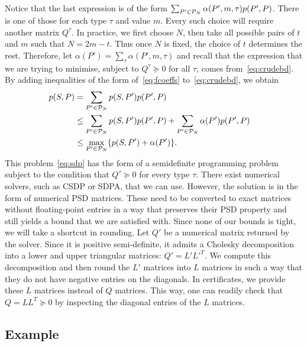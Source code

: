 Notice that the last expression is of the form $\sum_{P' \in \P_N} \alpha(P',m,\tau)p(P',P)$. There is one of those for each type $\tau$ and value $m$. Every such choice will require another matrix $Q^\tau$. In practice, we first choose $N$, then take all possible pairs of $t$ and $m$ such that $N = 2m-t$. Thus once $N$ is fixed, the choice of $t$ determines the rest. Therefore, let $\alpha(P') = \sum_{\tau} \alpha(P',m,\tau)$ and recall that the expression that we are trying to minimise, subject to $Q^\tau \succeq 0$ for all $\tau$, comes from~\eqref{eq:crudebd}. By adding inequalities of the form of~\eqref{eq:fcoeffs} to~\eqref{eq:crudebd}, we obtain 
\begin{align}
p(S,P) &= \sum_{P'\in \P_N}p(S,P')p(P',P) \notag\\
  &\leq \sum_{P'\in \P_N}p(S,P')p(P',P) + \sum_{P'\in \P_N}\alpha(P')p(P',P)\quad \notag\\
  &\leq \max_{P'\in \P_N}\{p(S,P') + \alpha(P')\}. \label{eq:sdp}
\end{align}
This problem~\eqref{eq:sdp} has the form of a semidefinite programming problem subject to the condition that $Q^\tau \succeq 0$ for every type $\tau$. There exist numerical solvers, such as CSDP or SDPA, that we can use. However, the solution is in the form of numerical PSD matrices. These need to be converted to exact matrices without floating-point entries in a way that preserves their PSD property and still yields a bound that we are satisfied with. Since none of our bounds is tight, we will take a shortcut in rounding. Let $Q'$ be a numerical matrix returned by the solver. Since it is positive semi-definite, it admits a Cholesky decomposition into a lower and upper triangular matrices: $Q' = L'L'^T$. We compute this decomposition and then round the $L'$ matrices into $L$ matrices in such a way that they do not have negative entries on the diagonals. In certificates, we provide these $L$ matrices instead of $Q$ matrices. This way, one can readily check that $Q = LL^T \succeq 0$ by inspecting the diagonal entries of the $L$ matrices. 
\subsection{Example}
\label{sec:example}

